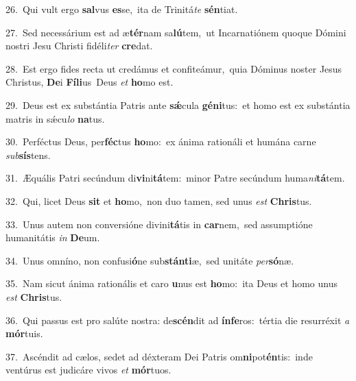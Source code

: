 {\numbfont\textcolor{\numbcolor}{26.}}~Qui vult ergo \textbf{sal}\-vus \textbf{es}\-se,~\star ita de Trinitá\textit{te} \textbf{sén}\-tiat.\par
{\numbfont\textcolor{\numbcolor}{27.}}~Sed necessárium est ad æ\-\textbf{tér}\-nam sa\-\textbf{lú}\-tem,~\star ut Incarnatiónem quoque Dómini nostri Jesu Christi fidéli\textit{ter} \textbf{cre}\-dat.\par
{\numbfont\textcolor{\numbcolor}{28.}}~Est ergo fides recta ut credámus et confiteámur,~\dagger quia Dóminus noster Jesus Christus, \textbf{De}\-i \textbf{Fí}\-\textbf{li}us~\star Deus \textit{et} \textbf{ho}\-mo est.\par
{\numbfont\textcolor{\numbcolor}{29.}}~Deus est ex substántia Patris ante \textbf{sǽ}\-cula \textbf{gé}\-\textbf{ni}tus:~\star et homo est ex substántia matris in sǽcu\textit{lo} \textbf{na}\-tus.\par
{\numbfont\textcolor{\numbcolor}{30.}}~Perféctus Deus, per\-\textbf{féc}\-tus \textbf{ho}\-mo:~\star ex ánima rationáli et humána carne \textit{sub}\-\textbf{sís}tens.\par
{\numbfont\textcolor{\numbcolor}{31.}}~Æquális Patri secúndum di\-\textbf{vi}\-ni\-\textbf{tá}\-tem:~\star minor Patre secúndum huma\-\textit{ni}\-\textbf{tá}tem.\par
{\numbfont\textcolor{\numbcolor}{32.}}~Qui, licet Deus \textbf{sit} et \textbf{ho}\-mo,~\star non duo tamen, sed unus \textit{est} \textbf{Chris}\-tus.\par
{\numbfont\textcolor{\numbcolor}{33.}}~Unus autem non conversióne divini\-\textbf{tá}\-tis in \textbf{car}\-nem,~\star sed assumptióne humanitátis \textit{in} \textbf{De}\-um.\par
{\numbfont\textcolor{\numbcolor}{34.}}~Unus omníno, non confusi\-\textbf{ó}\-ne sub\-\textbf{stán}\-\textbf{ti}æ,~\star sed unitáte \textit{per}\-\textbf{só}næ.\par
{\numbfont\textcolor{\numbcolor}{35.}}~Nam sicut ánima rationális et caro \textbf{u}\-nus est \textbf{ho}\-mo:~\star ita Deus et homo unus \textit{est} \textbf{Chris}\-tus.\par
{\numbfont\textcolor{\numbcolor}{36.}}~Qui passus est pro salúte nostra: de\-\textbf{scén}\-dit ad \textbf{ín}\-\textbf{fe}ros:~\star tértia die resurréxit \textit{a} \textbf{mór}\-tuis.\par
{\numbfont\textcolor{\numbcolor}{37.}}~Ascéndit ad cælos, sedet ad déxteram Dei Patris om\-\textbf{ni}\-pot\-\textbf{én}\-tis:~\star inde ventúrus est judicáre vivos \textit{et} \textbf{mór}\-tuos.\par
